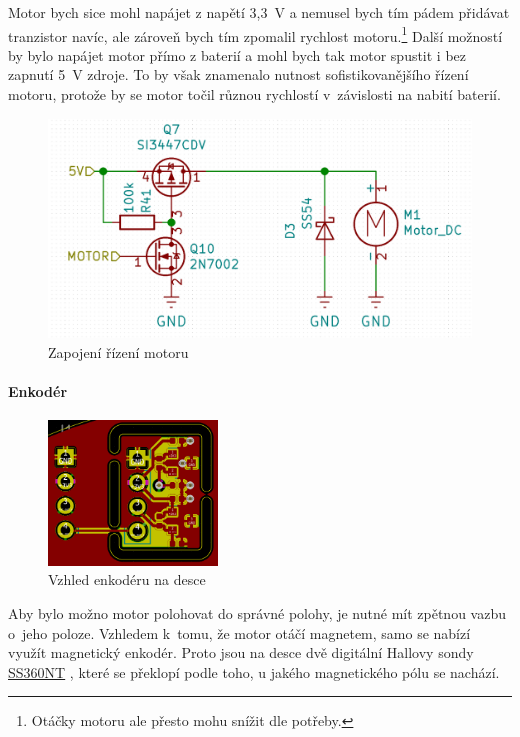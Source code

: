 Motor bych sice mohl napájet z napětí 3,3~V a nemusel bych tím pádem přidávat tranzistor navíc, ale zároveň bych tím zpomalil rychlost motoru.\footnote{Otáčky
 motoru ale přesto mohu snížit dle potřeby.}
Další možností by bylo napájet motor přímo z baterií a mohl bych tak motor spustit i bez zapnutí 5~V zdroje. To by však znamenalo nutnost 
sofistikovanějšího řízení motoru, protože by se motor točil různou rychlostí v~závislosti na nabití baterií.

\begin{figure}[htbp]
    \centering
    \includegraphics[width=\textwidth]{kapitoly/obrazky/E4/ir_motor_enkoder/ovladani_motoru.png}
    \caption{Zapojení řízení motoru}
    \label{fig:E4-motor}
\end{figure}

\paragraph{Enkodér}

\begin{figure}
    \centering
    \includegraphics[width= 0.4\textwidth]{kapitoly/obrazky/E4/ir_motor_enkoder/pcb-enc.png}
    \caption{\label{fig:E4-enkoder_pcb}Vzhled enkodéru na desce \centering}
\end{figure}
Aby bylo možno motor polohovat do správné polohy, je nutné mít zpětnou vazbu o~jeho poloze. Vzhledem k~tomu, že motor otáčí magnetem, samo se nabízí využít magnetický enkodér. 
Proto jsou na desce dvě digitální Hallovy sondy \href{https://datasheet.lcsc.com/szlcsc/Honeywell-SS360ST_C111924.pdf}{SS360NT} \parencite{ss360nt}, které se překlopí podle toho, 
u jakého magnetického pólu se nachází. 

